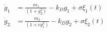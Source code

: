 \documentclass[10pt]{article}
\begin{document}
\begin{align*}\dot{g}_1 &= \frac{m_1}{(1+g_2^2)} - k_D g_1 + \sigma \xi_1(t)\\
\dot{g}_2 &= \frac{m_2}{(1+c g_1^2)} - k_D g_2 + \sigma\xi_2(t)\end{align*}
\end{document}
